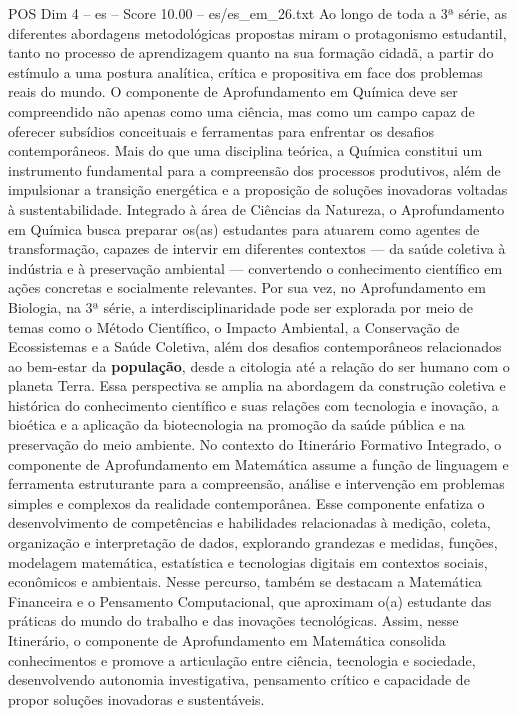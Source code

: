 \begin{textsample}{POS Dim 4 – es – Score 10.00 – es/es\_em\_26.txt}
Ao longo de toda a 3ª série, as diferentes abordagens metodológicas propostas miram o protagonismo estudantil, tanto no processo de aprendizagem quanto na sua formação cidadã, a partir do estímulo a uma postura analítica, crítica e propositiva em face dos problemas reais do mundo.
O componente de Aprofundamento em Química deve ser compreendido não apenas como uma ciência, mas como um campo capaz de oferecer subsídios conceituais e ferramentas para enfrentar os desafios contemporâneos.
Mais do que uma disciplina teórica, a Química constitui um instrumento fundamental para a compreensão dos processos produtivos, além de impulsionar a transição energética e a proposição de soluções inovadoras voltadas à sustentabilidade.
Integrado à área de Ciências da Natureza, o Aprofundamento em Química busca preparar os(as) estudantes para atuarem como agentes de transformação, capazes de intervir em diferentes contextos — da saúde coletiva à indústria e à preservação ambiental — convertendo o conhecimento científico em ações concretas e socialmente relevantes.
Por sua vez, no Aprofundamento em Biologia, na 3ª série, a interdisciplinaridade pode ser explorada por meio de temas como o Método Científico, o Impacto Ambiental, a Conservação de Ecossistemas e a Saúde Coletiva, além dos desafios contemporâneos relacionados ao bem-estar da \textbf{população}, desde a citologia até a relação do ser humano com o planeta Terra.
Essa perspectiva se amplia na abordagem da construção coletiva e histórica do conhecimento científico e suas relações com tecnologia e inovação, a bioética e a aplicação da biotecnologia na promoção da saúde pública e na preservação do meio ambiente.
No contexto do Itinerário Formativo Integrado, o componente de Aprofundamento em Matemática assume a função de linguagem e ferramenta estruturante para a compreensão, análise e intervenção em problemas simples e complexos da realidade contemporânea.
Esse componente enfatiza o desenvolvimento de competências e habilidades relacionadas à medição, coleta, organização e interpretação de dados, explorando grandezas e medidas, funções, modelagem matemática, estatística e tecnologias digitais em contextos sociais, econômicos e ambientais.
Nesse percurso, também se destacam a Matemática Financeira e o Pensamento Computacional, que aproximam o(a) estudante das práticas do mundo do trabalho e das inovações tecnológicas.
Assim, nesse Itinerário, o componente de Aprofundamento em Matemática consolida conhecimentos e promove a articulação entre ciência, tecnologia e sociedade, desenvolvendo autonomia investigativa, pensamento crítico e capacidade de propor soluções inovadoras e sustentáveis.

\end{textsample}

